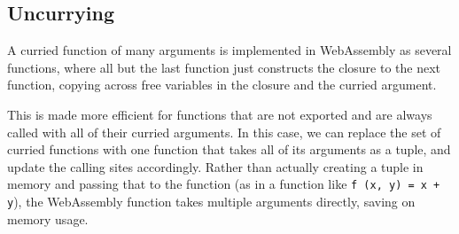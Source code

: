 \subsection{Uncurrying}


A curried function of many arguments is implemented in WebAssembly as several functions, where all but the last function just constructs the closure to the next function, copying across free variables in the closure and the curried argument. 

This is made more efficient for functions that are not exported and are always called with all of their curried arguments.  In this case, we can replace the set of curried functions with one function that takes all of its arguments as a tuple, and update the calling sites accordingly. Rather than actually creating a tuple in memory and passing that to the function (as in a function like \verb|f (x, y) = x + y|), the WebAssembly function takes multiple arguments directly, saving on memory usage. 

